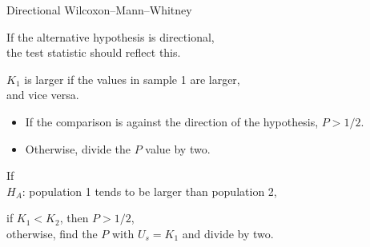 \begin{frame}{Directional Wilcoxon--Mann--Whitney}

  If the alternative hypothesis is \alert{directional}, \\
    the test statistic should reflect this.

    \vspace{2em}

     $K_1$ is larger if the values in sample 1 are larger, \\
    \hspace{2em} and vice versa.

    \vspace{2em}

    \begin{itemize}
      \item If the comparison is against the direction of the hypothesis, $P>1/2$.
      \item Otherwise, divide the $P$ value by two.
    \end{itemize}

    \vspace{2em}


      If \\
    $H_A$: population 1 tends to be larger than population 2, 
    
    \vspace{1em}

    \hspace{2em} if $K_1 < K_2$, then $P>1/2$, \\
    \hspace{2em} otherwise, find the $P$ with $U_s = K_1$ and divide by two.

\end{frame}

